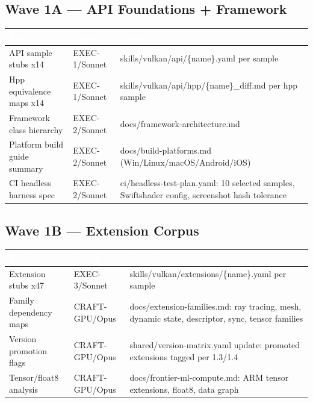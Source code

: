 \documentclass[11pt,letterpaper]{article}
\newcommand{\tableheader}[1]{\textbf{\sffamily\textcolor{white}{#1}}}
\begin{document}
\subsection{Wave 1A --- API Foundations + Framework}

\begin{center}
\begin{tabularx}{\textwidth}{L{3.5cm}L{2cm}X}
\toprule
{}
\tableheader{Task} & \tableheader{Agent} & \tableheader{Output} \\
\midrule
API sample stubs x14 & EXEC-1/Sonnet & skills/vulkan/api/\{name\}.yaml per sample \\
Hpp equivalence maps x14 & EXEC-1/Sonnet & skills/vulkan/api/hpp/\{name\}\_diff.md per hpp sample \\
Framework class hierarchy & EXEC-2/Sonnet & docs/framework-architecture.md \\
Platform build guide summary & EXEC-2/Sonnet & docs/build-platforms.md (Win/Linux/macOS/Android/iOS) \\
CI headless harness spec & EXEC-2/Sonnet & ci/headless-test-plan.yaml: 10 selected samples, Swiftshader config, screenshot hash tolerance \\
\bottomrule
\end{tabularx}
\end{center}

\subsection{Wave 1B --- Extension Corpus}

\begin{center}
\begin{tabularx}{\textwidth}{L{3.5cm}L{2cm}X}
\toprule
{}
\tableheader{Task} & \tableheader{Agent} & \tableheader{Output} \\
\midrule
Extension stubs x47 & EXEC-3/Sonnet & skills/vulkan/extensions/\{name\}.yaml per sample \\
Family dependency maps & CRAFT-GPU/Opus & docs/extension-families.md: ray tracing, mesh, dynamic state, descriptor, sync, tensor families \\
Version promotion flags & CRAFT-GPU/Opus & shared/version-matrix.yaml update: promoted extensions tagged per 1.3/1.4 \\
Tensor/float8 analysis & CRAFT-GPU/Opus & docs/frontier-ml-compute.md: ARM tensor extensions, float8, data graph \\
\bottomrule
\end{tabularx}
\end{center}
\end{document}
